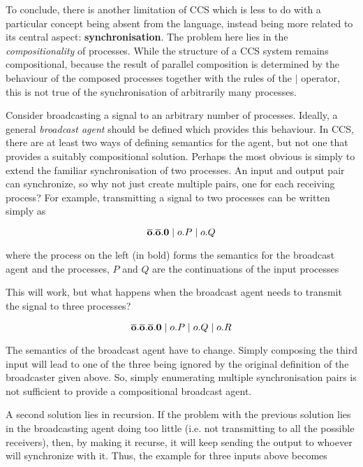 To conclude, there is another limitation of CCS which is less to do
with a particular concept being absent from the language, instead
being more related to its central aspect: \textbf{synchronisation}.
The problem here lies in the \emph{compositionality} of processes.
While the structure of a CCS system remains compositional, because the
result of parallel composition is determined by the behaviour of the
composed processes together with the rules of the $|$ operator, this
is not true of the synchronisation of arbitrarily many processes.

Consider broadcasting a signal to an arbitrary number of processes.
Ideally, a general \emph{broadcast agent} should be defined which
provides this behaviour.  In CCS, there are at least two ways of
defining semantics for the agent, but not one that provides a suitably
compositional solution.  Perhaps the most obvious is simply to extend
the familiar synchronisation of two processes.  An input and output
pair can synchronize, so why not just create multiple pairs, one for
each receiving process?  For example, transmitting a signal to two
processes can be written simply as

\begin{equation}
\mathbf{\overline{o}.\overline{o}.0} \;|\; o.P \;|\; o.Q
\end{equation}

\noindent where the process on the left (in bold) forms the semantics
for the broadcast agent and the processes, $P$ and $Q$ are the
continuations of the input processes

This will work, but what happens when the broadcast agent needs to
transmit the signal to three processes?

\begin{equation}
\mathbf{\overline{o}.\overline{o}.\overline{o}.0} \;|\; o.P \;|\; o.Q \;|\; o.R
\end{equation}

\noindent The semantics of the broadcast agent have to change.  Simply
composing the third input will lead to one of the three being ignored
by the original definition of the broadcaster given above.  So, simply
enumerating multiple synchronisation pairs is not sufficient to
provide a compositional broadcast agent.

A second solution lies in recursion.  If the problem with the previous
solution lies in the broadcasting agent doing too little (i.e. not
transmitting to all the possible receivers), then, by making it
recurse, it will keep sending the output to whoever will synchronize
with it.  Thus, the example for three inputs above becomes

